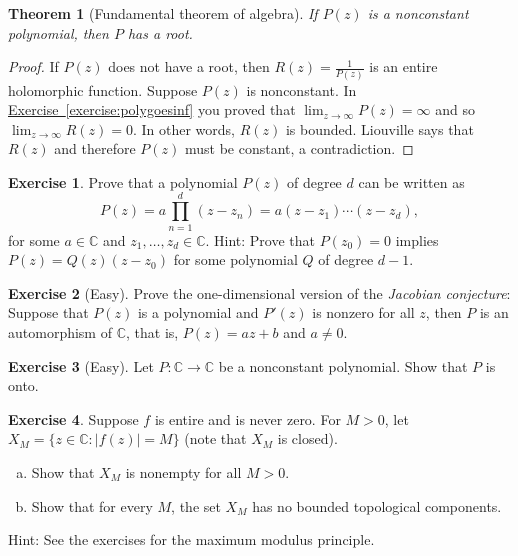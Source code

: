 \documentclass[12pt,openany]{book}
\newcommand{\sabs}[1]{\lvert {#1} \rvert}
\newcommand{\C}{{\mathbb{C}}}
\newcommand{\myindex}[1]{#1\index{#1}}
\theoremstyle{plain}
\newtheorem{thm}{Theorem}[section]
\theoremstyle{remark}
\theoremstyle{definition}
\newenvironment{exbox}{%
    \def\FrameCommand{\vrule width 1pt \relax\hspace{10pt}}%
    \MakeFramed{\advance\hsize-\width\FrameRestore}%
}{%
    \endMakeFramed
}
\newenvironment{exparts}{%
    \leavevmode\begin{enumerate}[a),noitemsep,topsep=0pt,parsep=0pt,partopsep=0pt]
}{%
    \end{enumerate}
}
\theoremstyle{exercise}
\newtheorem{exercise}{Exercise}[section]
\theoremstyle{example}
\newcommand{\exerciseref}[1]{\hyperref[#1]{Exercise~\ref*{#1}}}
\begin{document}
\begin{thm}[Fundamental theorem of algebra]
If $P(z)$ is a nonconstant polynomial, then $P$ has a root.
\end{thm}

\begin{proof}
If $P(z)$ does not have a root, then $R(z) = \frac{1}{P(z)}$ is
an entire holomorphic function.
Suppose $P(z)$ is nonconstant.
In \exerciseref{exercise:polygoesinf} you proved that
$\lim_{z \to \infty} P(z) = \infty$ and so
$\lim_{z \to \infty} R(z) = 0$.  In other words, $R(z)$ is bounded.
Liouville says that $R(z)$ and therefore $P(z)$ must be constant, a
contradiction.
\end{proof}

\begin{exbox}
\begin{exercise}
Prove that a polynomial $P(z)$ of degree $d$ can be written as
\begin{equation*}
P(z) = a \prod_{n=1}^d (z-z_n) = a (z-z_1) \cdots (z-z_d),
\end{equation*}
for some $a \in \C$ and $z_1,\ldots,z_d \in \C$.
Hint: Prove that $P(z_0) = 0$ implies $P(z) = Q(z) (z-z_0)$ for some
polynomial $Q$ of degree $d-1$.
\end{exercise}

\begin{exercise}[Easy]
Prove the one-dimensional version of the \emph{\myindex{Jacobian conjecture}}:
Suppose that $P(z)$ is a polynomial and $P'(z)$ is nonzero for all $z$,
then $P$ is an automorphism of $\C$, that is, $P(z) = az+b$ and $a \not= 0$.
\end{exercise}

\begin{exercise}[Easy]
Let $P \colon \C \to \C$ be a nonconstant polynomial.  Show that $P$ is
onto.
\end{exercise}

\begin{exercise}
Suppose $f$ is entire and is never zero.  For $M > 0$, let
$X_M = \bigl\{ z \in \C : \sabs{f(z)} = M \bigr\}$ (note that $X_M$
is closed).
\begin{exparts}
\item Show that $X_M$ is nonempty for all $M > 0$.
\item Show that for every $M$, the set $X_M$ has no bounded topological components.
\end{exparts}
Hint: See the exercises for the maximum modulus principle.
\end{exercise}
\end{exbox}
\end{document}
